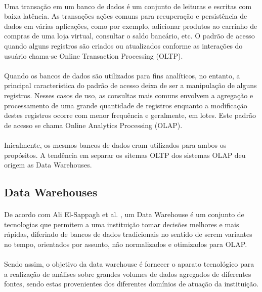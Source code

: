 \paragraph{} Uma transação em um banco de dados é um conjunto de leituras e escritas com baixa latência. As transações ações comuns para recuperação e persistência de dados em várias aplicações, como por exemplo, adicionar produtos ao carrinho de compras de uma loja virtual, consultar o saldo bancário, etc. 
O padrão de acesso quando alguns registros são criados ou atualizados conforme as interações do usuário chama-se Online Transaction Processing (OLTP).

\paragraph{} Quando os bancos de dados são utilizados para fins analíticos, no entanto, a principal característica do padrão de acesso deixa de ser a manipulação
de alguns registros. Nesses casos de uso, as consultas mais comuns envolvem a agregação e processamento de uma grande quantidade de registros enquanto a 
modificação destes registros ocorre com menor frequência e geralmente, em lotes. Este padrão de acesso se chama Online Analytics Processing (OLAP).

\paragraph{} Inicalmente, os mesmos bancos de dados eram utilizados para ambos os propósitos. A tendência em separar os sitemas OLTP dos sistemas OLAP deu origem as Data Warehouses.\cite{kleppmann2017designing}

\subsection{Data Warehouses}

\paragraph{} De acordo com Ali El-Sappagh et al. \cite{el2011proposed}, um Data Warehouse é um conjunto de tecnologias que permitem a uma instituição tomar decisões melhores e mais rápidas, diferindo de bancos de dados tradicionais no sentido de serem variantes no tempo, orientados por assunto, não normalizados e otimizados para OLAP.

\paragraph{} Sendo assim, o objetivo da data warehouse é fornecer o aparato tecnológico para a realização de análises sobre grandes volumes de dados agregados de diferentes fontes, sendo estas provenientes dos diferentes domínios de atuação da instituição.

